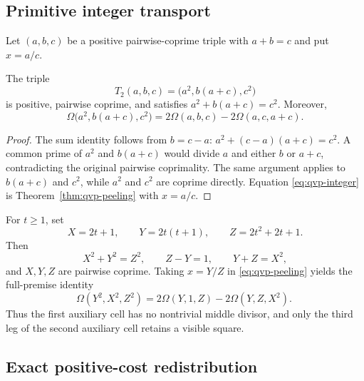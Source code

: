 \subsection{Primitive integer transport}

Let $(a,b,c)$ be a positive pairwise-coprime triple with $a+b=c$ and put
$x=a/c$.

\begin{proposition}
\label{prop:qvp-integer-transform}
The triple
\[
 T_2(a,b,c)=\bigl(a^2,b(a+c),c^2\bigr)
\]
is positive, pairwise coprime, and satisfies
$a^2+b(a+c)=c^2$.  Moreover,
\begin{equation}
 \Omega\bigl(a^2,b(a+c),c^2\bigr)
 =2\Omega(a,b,c)-2\Omega(a,c,a+c).
 \label{eq:qvp-integer}
\end{equation}
\end{proposition}

\begin{proof}
The sum identity follows from $b=c-a$:
$a^2+(c-a)(a+c)=c^2$.  A common prime of $a^2$ and $b(a+c)$ would divide
$a$ and either $b$ or $a+c$, contradicting the original pairwise
coprimality.  The same argument applies to $b(a+c)$ and $c^2$, while
$a^2$ and $c^2$ are coprime directly.  Equation
\eqref{eq:qvp-integer} is Theorem~\ref{thm:qvp-peeling} with $x=a/c$.
\end{proof}

For $t\geq1$, set
\[
 X=2t+1,\qquad Y=2t(t+1),\qquad Z=2t^2+2t+1.
\]
Then
\[
 X^2+Y^2=Z^2,\qquad Z-Y=1,\qquad Y+Z=X^2,
\]
and $X,Y,Z$ are pairwise coprime.  Taking $x=Y/Z$ in
\eqref{eq:qvp-peeling} yields the full-premise identity
\begin{equation}
 \boxed{\displaystyle
 \Omega(Y^2,X^2,Z^2)
 =2\Omega(Y,1,Z)-2\Omega(Y,Z,X^2).\ }
 \label{eq:qvp-pythagorean}
\end{equation}
Thus the first auxiliary cell has no nontrivial middle divisor, and only the
third leg of the second auxiliary cell retains a visible square.

\subsection{Exact positive-cost redistribution}

